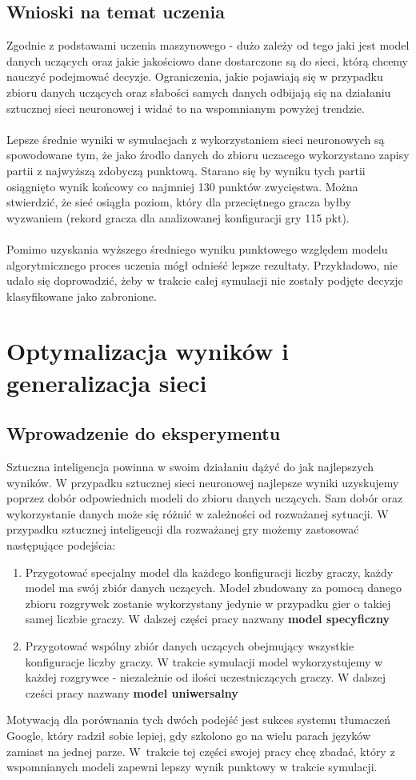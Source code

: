\documentclass[12pt, oneside]{report}
\begin{document}
\section{Wnioski na temat uczenia}
Zgodnie z podstawami uczenia maszynowego - dużo zależy od tego jaki jest model danych uczących oraz jakie jakościowo dane dostarczone są do sieci, którą chcemy nauczyć podejmować decyzje. Ograniczenia, jakie pojawiają się w przypadku zbioru danych uczących oraz słabości samych danych odbijają się na działaniu sztucznej sieci neuronowej i widać to na wspomnianym powyżej trendzie. \\ \\ 
Lepsze średnie wyniki w symulacjach z wykorzystaniem sieci neuronowych są spowodowane tym, że jako źrodlo danych do zbioru uczacego wykorzystano zapisy partii z najwyższą zdobyczą punktową. Starano się by wyniku tych partii osiągnięto wynik końcowy co najmniej 130 punktów zwycięstwa. Można stwierdzić, że sieć osiągła poziom, który dla przeciętnego gracza byłby wyzwaniem (rekord gracza dla analizowanej konfiguracji gry 115 pkt).
 \\ \\
Pomimo uzyskania wyższego średniego wyniku punktowego względem modelu algorytmicznego proces uczenia mógł odnieść lepsze rezultaty. Przykładowo, nie udało się doprowadzić, żeby w trakcie całej symulacji nie zostały podjęte decyzje klasyfikowane jako zabronione. 
\chapter{Optymalizacja wyników i generalizacja sieci}
\section{Wprowadzenie do eksperymentu}
\label{ch:compare_data}
Sztuczna inteligencja powinna w swoim działaniu dążyć do jak najlepszych wyników. W przypadku sztucznej sieci neuronowej najlepsze wyniki uzyskujemy poprzez dobór odpowiednich modeli do zbioru danych uczących. Sam dobór oraz wykorzystanie danych może się różnić w zależności od rozważanej sytuacji. W przypadku sztucznej inteligencji dla rozważanej gry możemy zastosować następujące podejścia:

\begin{enumerate}
	\item Przygotować specjalny model dla każdego konfiguracji liczby graczy, każdy model ma swój zbiór danych uczących. Model zbudowany za pomocą danego zbioru rozgrywek zostanie wykorzystany jedynie w przypadku gier o takiej samej liczbie graczy. W dalszej części pracy nazwany \textbf{model specyficzny}
	\item Przygotować wspólny zbiór danych uczących obejmujący wszystkie konfiguracje liczby graczy. W trakcie symulacji model wykorzystujemy w każdej rozgrywce - niezależnie od ilości uczestniczących graczy. W dalszej cześci pracy nazwany \textbf{model uniwersalny}
\end{enumerate}
Motywacją dla porównania tych dwóch podejść jest sukces systemu tłumaczeń Google, który radził sobie lepiej, gdy szkolono go na wielu parach języków zamiast na jednej parze. W~trakcie tej części swojej pracy chcę zbadać, który z wspomnianych modeli zapewni lepszy wynik punktowy w trakcie symulacji.
\end{document}

